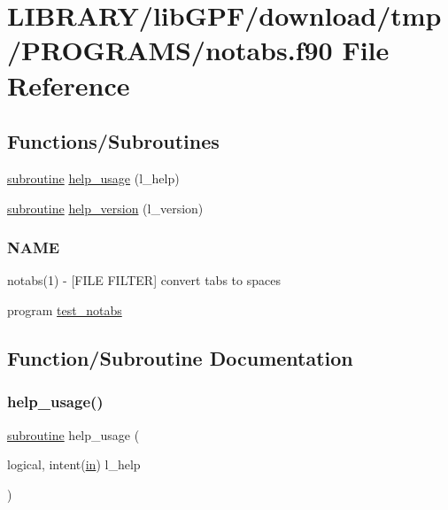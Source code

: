 \hypertarget{notabs_8f90}{}\section{L\+I\+B\+R\+A\+R\+Y/lib\+G\+P\+F/download/tmp/\+P\+R\+O\+G\+R\+A\+M\+S/notabs.f90 File Reference}
\label{notabs_8f90}
\subsection*{Functions/\+Subroutines}
\begin{DoxyCompactItemize}
\item 
\hyperlink{M__stopwatch_83_8txt_acfbcff50169d691ff02d4a123ed70482}{subroutine} \hyperlink{notabs_8f90_a3e09a3b52ee8fb04eeb93fe5761626a8}{help\+\_\+usage} (l\+\_\+help)
\item 
\hyperlink{M__stopwatch_83_8txt_acfbcff50169d691ff02d4a123ed70482}{subroutine} \hyperlink{notabs_8f90_a39c21619b08a3c22f19e2306efd7f766}{help\+\_\+version} (l\+\_\+version)
\begin{DoxyCompactList}\small\item\em \subsubsection*{N\+A\+ME}

notabs(1) -\/ \mbox{[}F\+I\+LE F\+I\+L\+T\+ER\mbox{]} convert tabs to spaces \end{DoxyCompactList}\item 
program \hyperlink{notabs_8f90_acb31f04c67c279d1a77f3346ad0cf516}{test\+\_\+notabs}
\end{DoxyCompactItemize}


\subsection{Function/\+Subroutine Documentation}
\mbox{\label{notabs_8f90_a3e09a3b52ee8fb04eeb93fe5761626a8}} 
\subsubsection{\texorpdfstring{help\+\_\+usage()}{help\_usage()}}
{\footnotesize\ttfamily \hyperlink{M__stopwatch_83_8txt_acfbcff50169d691ff02d4a123ed70482}{subroutine} help\+\_\+usage (\begin{DoxyParamCaption}\item[{logical, intent(\hyperlink{M__journal_83_8txt_afce72651d1eed785a2132bee863b2f38}{in})}]{l\+\_\+help }\end{DoxyParamCaption})}



